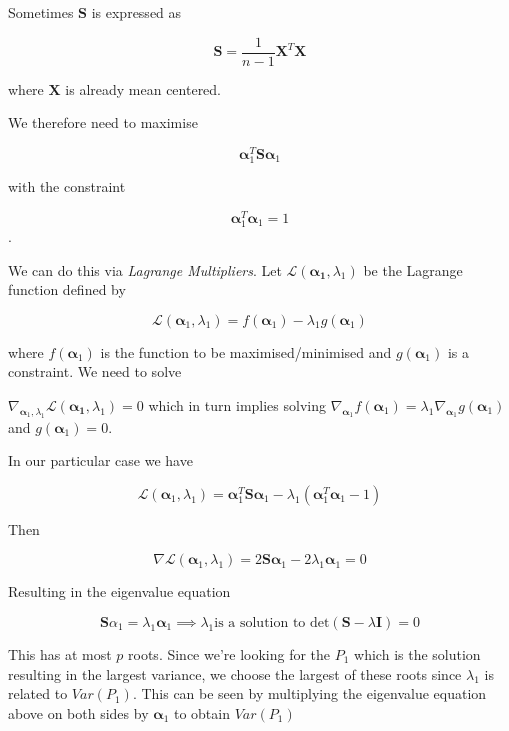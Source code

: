 \documentclass[11pt]{article}
\begin{document}
Sometimes \(\boldsymbol{S}\) is expressed as

\[\boldsymbol{S} =  \frac{1}{n-1} \boldsymbol{X}^T \boldsymbol{X}\]

where \(\boldsymbol{X}\) is already mean centered.

We therefore need to maximise

\[\boldsymbol{\alpha}_{1}^T \boldsymbol{S} \boldsymbol{\alpha}_{1}\]

with the constraint

\[\boldsymbol{\alpha}_1^T \boldsymbol{\alpha}_1 =  1\].

We can do this via \emph{Lagrange Multipliers}. Let
\(\mathcal{L}(\boldsymbol{\alpha_1},\lambda_1)\) be the Lagrange
function defined by

\[\mathcal{L}(\boldsymbol{\alpha}_1,\lambda_1) = f(\boldsymbol{\alpha}_1) - \lambda_1 g(\boldsymbol{\alpha}_1)\]

where \(f(\boldsymbol{\alpha}_1)\) is the function to be
maximised/minimised and \(g(\boldsymbol{\alpha}_1)\) is a constraint. We
need to solve

\(\nabla_{\boldsymbol{\alpha}_1,\lambda_1}\mathcal{L}(\boldsymbol{\alpha_1},\lambda_1) = 0\)
which in turn implies solving
\(\nabla_{\boldsymbol{\alpha}_1}f(\boldsymbol{\alpha}_1) = \lambda_1 \nabla_{\boldsymbol{\alpha}_1} g(\boldsymbol{\alpha}_1)\)
and \(g(\boldsymbol{\alpha}_1) = 0\).

In our particular case we have

\[\mathcal{L}(\boldsymbol{\alpha}_1,\lambda_1) = \boldsymbol{\alpha}_{1}^T \boldsymbol{S} \boldsymbol{\alpha}_{1} - \lambda_1 (\boldsymbol{\alpha}_1^T \boldsymbol{\alpha}_1 - 1)\]

Then

\[\nabla \mathcal{L}(\boldsymbol{\alpha}_1,\lambda_1) = 2 \boldsymbol{S} \boldsymbol{\alpha}_1 - 2 \lambda_1 \boldsymbol{\alpha}_1 = 0\]

Resulting in the eigenvalue equation

\[\boldsymbol{S} \alpha_1 = \lambda_1 \boldsymbol{\alpha}_1 \implies \lambda_1 \text{is a solution to det}(\boldsymbol{S} - \lambda \boldsymbol{I}) = 0\]

This has at most \(p\) roots. Since we're looking for the \(P_1\) which
is the solution resulting in the largest variance, we choose the largest
of these roots since \(\lambda_1\) is related to \(Var(P_1)\). This can
be seen by multiplying the eigenvalue equation above on both sides by
\(\boldsymbol{\alpha}_1\) to obtain \(Var(P_1)\)
\end{document}
